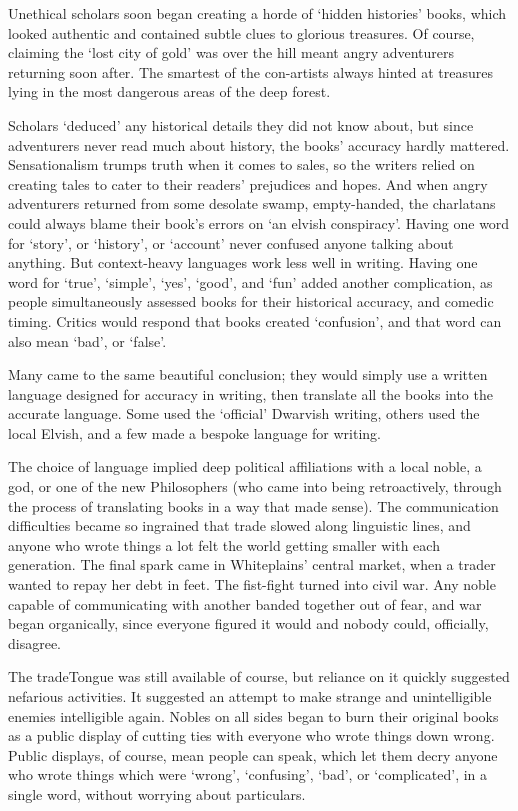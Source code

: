 \begin{exampletext}
    Unethical scholars soon began creating a horde of `hidden histories' books, which looked authentic and contained subtle clues to glorious treasures.
    Of course, claiming the `lost city of gold' was over the hill meant angry adventurers returning soon after.
    The smartest of the con-artists always hinted at treasures lying in the most dangerous areas of the deep forest.

    Scholars `deduced' any historical details they did not know about, but since adventurers never read much about history, the books' accuracy hardly mattered.
    Sensationalism trumps truth when it comes to sales, so the writers relied on creating tales to cater to their readers' prejudices and hopes.
    And when angry adventurers returned from some desolate swamp, empty-handed, the charlatans could always blame their book's errors on `an elvish conspiracy'.
  \else
    Having one word for `story', or `history', or `account' never confused anyone talking about anything.
    But context-heavy languages work less well in writing.
    Having one word for `true', `simple', `yes', `good', and `fun' added another complication, as people simultaneously assessed books for their historical accuracy, and comedic timing.
    Critics would respond that books created `confusion', and that word can also mean `bad', or `false'.

    Many came to the same beautiful conclusion; they would simply use a written language designed for accuracy in writing, then translate all the books into the accurate language.
    Some used the `official' Dwarvish writing, others used the local Elvish, and a few made a bespoke language for writing.

    The choice of language implied deep political affiliations with a local noble, a god, or one of the new Philosophers (who came into being retroactively, through the process of translating books in a way that made sense).
    The communication difficulties became so ingrained that trade slowed along linguistic lines, and anyone who wrote things a lot felt the world getting smaller with each generation.
    The final spark came in Whiteplains' central market, when a trader wanted to repay her debt in feet.
    The fist-fight turned into civil war.
    Any noble capable of communicating with another banded together out of fear, and war began organically, since everyone figured it would and nobody could, officially, disagree.

    The \gls{tradeTongue} was still available of course, but reliance on it quickly suggested nefarious activities.
    It suggested an attempt to make strange and unintelligible enemies intelligible again.
    Nobles on all sides began to burn their original books as a public display of cutting ties with everyone who wrote things down wrong.
    Public displays, of course, mean people can speak, which let them decry anyone who wrote things which were `wrong', `confusing', `bad', or `complicated', in a single word, without worrying about particulars.


\end{exampletext}
